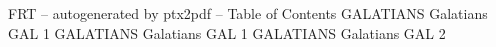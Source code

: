 \id FRT -- autogenerated by ptx2pdf --
\is Table of Contents
\tr {} GALATIANS Galatians GAL 1
\tr {} GALATIANS Galatians GAL 1
\tr {} GALATIANS Galatians GAL 2
